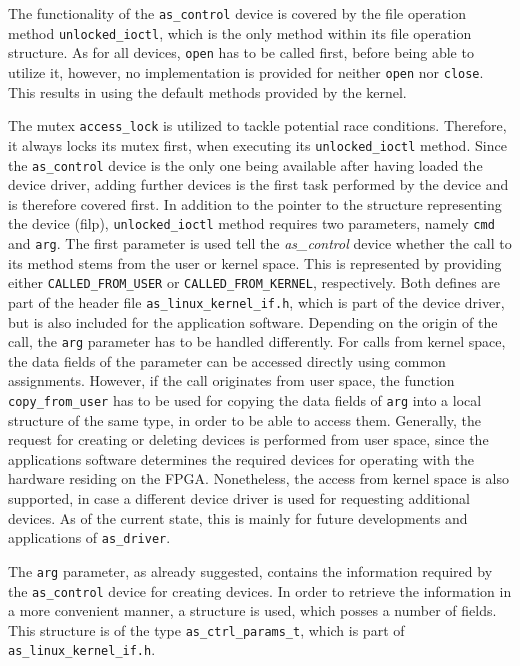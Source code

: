 The functionality of the \texttt{as\_control} device is covered by the file operation method \texttt{unlocked\_ioctl}, which is the only method within its file operation structure.
As for all devices, \texttt{open} has to be called first, before being able to utilize it, however, no implementation is provided for neither \texttt{open} nor \texttt{close}.
This results in using the default methods provided by the kernel.

The mutex \texttt{access\_lock} is utilized to tackle potential race conditions.
Therefore, it always locks its mutex first, when executing its \texttt{unlocked\_ioctl} method.
Since the \texttt{as\_control} device is the only one being available after having loaded the \asterics device driver, adding further devices is the first task performed by the device and is therefore covered first.
In addition to the pointer to the structure representing the device (filp), \texttt{unlocked\_ioctl} method requires two parameters, namely \texttt{cmd} and \texttt{arg}.
The first parameter is used tell the \textit{as\_control} device whether the call to its method stems from the user or kernel space.
This is represented by providing either \texttt{CALLED\_FROM\_USER} or \texttt{CALLED\_FROM\_KERNEL}, respectively.
Both defines are part of the header file \texttt{as\_linux\_kernel\_if.h}, which is part of the \asterics device driver, but is also included for the application software.
Depending on the origin of the call, the \texttt{arg} parameter has to be handled differently.
For calls from kernel space, the data fields of the parameter can be accessed directly using common assignments.
However, if the call originates from user space, the function \texttt{copy\_from\_user} has to be used for copying the data fields of \texttt{arg} into a local structure of the same type, in order to be able to access them.
Generally, the request for creating or deleting devices is performed from user space, since the applications software determines the required devices for operating with the hardware residing on the FPGA.
Nonetheless, the access from kernel space is also supported, in case a different device driver is used for requesting additional devices.
As of the current state, this is mainly for future developments and applications of \texttt{as\_driver}.

The \texttt{arg} parameter, as already suggested, contains the information required by the \texttt{as\_control} device for creating devices.
In order to retrieve the information in a more convenient manner, a structure is used, which posses a number of fields.
This structure is of the type \texttt{as\_ctrl\_params\_t}, which is part of \texttt{as\_linux\_kernel\_if.h}.


